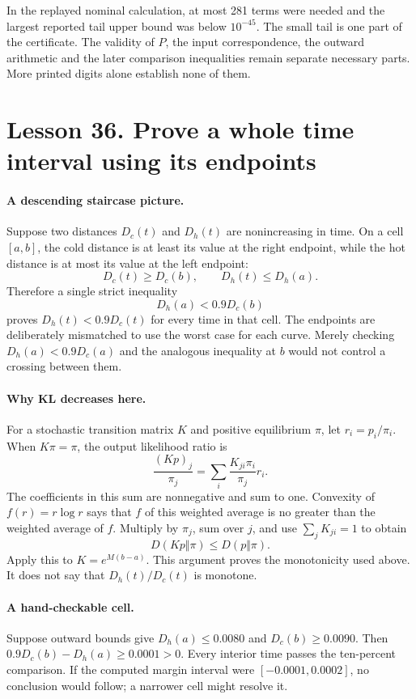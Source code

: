 In the replayed nominal calculation, at most 281 terms were needed and the
largest reported tail upper bound was below $10^{-45}$. The small tail is
one part of the certificate. The validity of $P$, the input correspondence,
the outward arithmetic and the later comparison inequalities remain
separate necessary parts. More printed digits alone establish none of them.

\section*{Lesson 36. Prove a whole time interval using its endpoints}
\paragraph{A descending staircase picture.}
Suppose two distances $D_c(t)$ and $D_h(t)$ are nonincreasing in time.
On a cell $[a,b]$, the cold distance is at least its value at the right
endpoint, while the hot distance is at most its value at the left endpoint:
\[
 D_c(t)\geq D_c(b),\qquad D_h(t)\leq D_h(a).
\]
Therefore a single strict inequality
\[
 D_h(a)<0.9D_c(b)
\]
proves $D_h(t)<0.9D_c(t)$ for every time in that cell.
The endpoints are deliberately mismatched to use the worst case for each
curve. Merely checking $D_h(a)<0.9D_c(a)$ and the analogous inequality at
$b$ would not control a crossing between them.

\paragraph{Why KL decreases here.}
For a stochastic transition matrix $K$ and positive equilibrium $\pi$,
let $r_i=p_i/\pi_i$. When $K\pi=\pi$, the output likelihood ratio is
\[
 \frac{(Kp)_j}{\pi_j}=\sum_i\frac{K_{ji}\pi_i}{\pi_j}r_i.
\]
The coefficients in this sum are nonnegative and sum to one. Convexity of
$f(r)=r\log r$ says that $f$ of this weighted average is no greater than
the weighted average of $f$. Multiply by $\pi_j$, sum over $j$, and use
$\sum_jK_{ji}=1$ to obtain
\[
 D(Kp\Vert\pi)\leq D(p\Vert\pi).
\]
Apply this to $K=e^{M(b-a)}$. This argument proves the monotonicity used
above. It does not say that $D_h(t)/D_c(t)$ is monotone.

\paragraph{A hand-checkable cell.}
Suppose outward bounds give $D_h(a)\leq0.0080$ and
$D_c(b)\geq0.0090$. Then $0.9D_c(b)-D_h(a)\geq0.0001>0$.
Every interior time passes the ten-percent comparison. If the computed
margin interval were $[-0.0001,0.0002]$, no conclusion would follow;
a narrower cell might resolve it.

